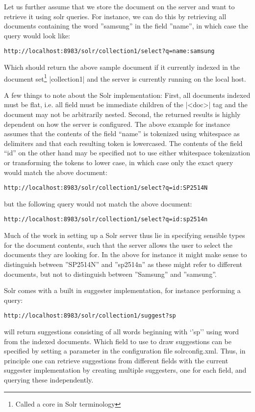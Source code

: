 Let us further assume that we store the document on the server and want to retrieve it using solr queries. For instance, we can do this by retrieving all documents containing the word ''samsung'' in the field ''name'', in which case the query would look like:

\begin{verbatim}
http://localhost:8983/solr/collection1/select?q=name:samsung
\end{verbatim}

Which should return the above sample document if it currently indexed in the document set\footnote{Called a core in Solr terminology} |collection1| and the server is currently running on the local host.

A few things to note about the Solr implementation: First, all documents indexed must be flat, i.e. all  field must be immediate children of the |<doc>| tag and the document may not be arbitrarily nested. Second, the returned results is highly dependent on how the server is configured. The above example for instance assumes that the contents of the field “name” is tokenized using whitespace as delimiters and that each resulting token is lowercased. The contents of the field “id” on the other hand may be specified not to use either whitespace tokenization or transforming the tokens to lower case, in which case only the exact query would match the above document:

\begin{verbatim}
http://localhost:8983/solr/collection1/select?q=id:SP2514N
\end{verbatim}

but the following query would not match the above document:

\begin{verbatim}
http://localhost:8983/solr/collection1/select?q=id:sp2514n
\end{verbatim}

Much of the work in setting up a Solr server thus lie in specifying sensible types for the document contents, such that the server allows the user to select the documents they are looking for. In the above for instance it might make sense to distinguish between ''SP2514N'' and ''sp2514n'' as these might refer to different documents, but not to distinguish between ''Samsung'' and ''samsung''.

Solr comes with a built in suggester implementation, for instance performing a query:

\begin{verbatim}
http://localhost:8983/solr/collection1/suggest?sp
\end{verbatim}

will return suggestions consisting of all words beginning with ‘’sp’’ using word from the indexed documents. Which field to use to draw suggestions can be specified by setting a parameter in the configuration file solrconfig.xml. Thus, in principle one can retrieve suggestions from different fields with the current suggester implementation by creating multiple suggesters, one for each field, and querying these independently.






